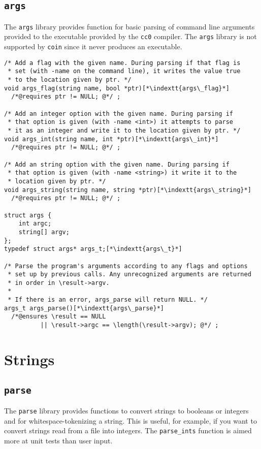 \documentclass[11pt]{article}
\makeatletter
\newcommand{\indextt}[1]{\index{#1@\texttt{#1}}}
\makeatother
\begin{document}
\clearpage
\subsection{\tt args}

The \lstinline'args' library provides function for basic parsing of command
line arguments provided to the executable provided by the \lstinline'cc0'
compiler.  The \lstinline'args' library is not supported by \lstinline'coin'
since it never produces an executable.

\begin{lstlisting}
/* Add a flag with the given name. During parsing if that flag is
 * set (with -name on the command line), it writes the value true
 * to the location given by ptr. */
void args_flag(string name, bool *ptr)[*\indextt{args\_flag}*]
  /*@requires ptr != NULL; @*/ ;

/* Add an integer option with the given name. During parsing if
 * that option is given (with -name <int>) it attempts to parse
 * it as an integer and write it to the location given by ptr. */
void args_int(string name, int *ptr)[*\indextt{args\_int}*]
  /*@requires ptr != NULL; @*/ ;

/* Add an string option with the given name. During parsing if
 * that option is given (with -name <string>) it write it to the
 * location given by ptr. */
void args_string(string name, string *ptr)[*\indextt{args\_string}*]
  /*@requires ptr != NULL; @*/ ;

struct args {
    int argc;
    string[] argv;
};
typedef struct args* args_t;[*\indextt{args\_t}*]

/* Parse the program's arguments according to any flags and options
 * set up by previous calls. Any unrecognized arguments are returned
 * in order in \result->argv.
 *
 * If there is an error, args_parse will return NULL. */
args_t args_parse()[*\indextt{args\_parse}*]
  /*@ensures \result == NULL
          || \result->argc == \length(\result->argv); @*/ ;
\end{lstlisting}


\section{Strings}

\subsection{\tt parse}

The \lstinline'parse' library provides functions to convert strings to
booleans or integers and for whitespace-tokenizing a string.  This is
useful, for example, if you want to convert strings read from a file
into integers. The \lstinline'parse_ints' function is aimed more at unit
tests than user input.
\end{document}
